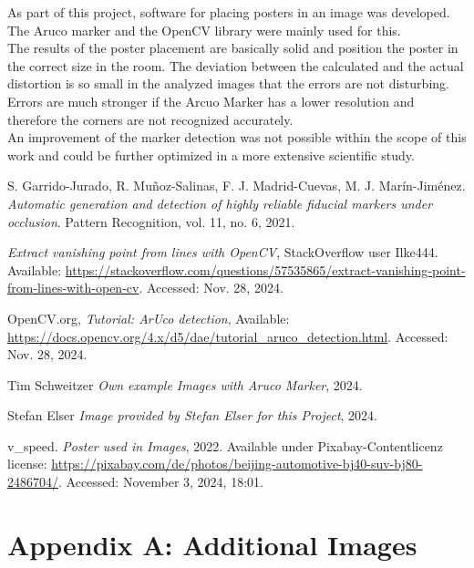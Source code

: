 \documentclass[a4paper,twocolumn]{article}
\begin{document}
As part of this project, software for placing posters in an image was developed. The Aruco marker and the OpenCV library were mainly used for this.
\\
The results of the poster placement are basically solid and position the poster in the correct size in the room. The deviation between the calculated and the actual distortion is so small in the analyzed images that the errors are not disturbing. Errors are much stronger if the Arcuo Marker has a lower resolution and therefore the corners are not recognized accurately.
\\
An improvement of the marker detection was not possible within the scope of this work and could be further optimized in a more extensive scientific study.

\begin{thebibliography}{9}

    S. Garrido-Jurado, R. Muñoz-Salinas, F. J. Madrid-Cuevas, M. J. Marín-Jiménez. 
    \textit{Automatic generation and detection of highly reliable fiducial markers under occlusion}. 
    Pattern Recognition, vol. 11, no. 6, 2021.
    
    \textit{Extract vanishing point from lines with OpenCV}, 
    StackOverflow user Ilke444. Available: \url{https://stackoverflow.com/questions/57535865/extract-vanishing-point-from-lines-with-open-cv}. 
    Accessed: Nov. 28, 2024.

    OpenCV.org, 
    \textit{Tutorial: ArUco detection}, 
    Available: \url{https://docs.opencv.org/4.x/d5/dae/tutorial_aruco_detection.html}. 
    Accessed: Nov. 28, 2024.

    Tim Schweitzer \textit{Own example Images with Aruco Marker}, 2024.

    Stefan Elser \textit{Image provided by Stefan Elser for this Project}, 2024.

    v\_speed. \textit{Poster used in Images}, 2022. Available under Pixabay-Contentlicenz license: \url{https://pixabay.com/de/photos/beijing-automotive-bj40-suv-bj80-2486704/}. Accessed: November 3, 2024, 18:01.

\end{thebibliography}

\appendix
\section*{Appendix A: Additional Images}
\end{document}
